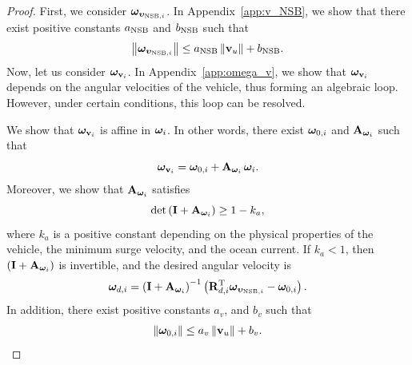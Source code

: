 \begin{proof}
    
    
    First, we consider $\bm{\omega}_{\bm{\upsilon}_{{\rm NSB}, i}}$.
    In Appendix~\ref{app:v_NSB}, we show that there exist positive constants $a_{\rm NSB}$ and $b_{\rm NSB}$ such that 
    \begin{equation}
        \left\|\bm{\omega}_{\bm{\upsilon}_{{\rm NSB}, i}}\right\| \leq a_{\rm NSB}\left\|\mathbf{v}_u\right\| + b_{\rm NSB}.
        \label{eq:NSB_R_omega_NSB_bound}
    \end{equation}
    Now, let us consider $\bm{\omega}_{\mathbf{v}_i}$.
    In Appendix~\ref{app:omega_v}, we show that $\bm{\omega}_{\mathbf{v}_i}$ depends on the angular velocities of the vehicle, thus forming an algebraic loop.
    However, under certain conditions, this loop can be resolved.

    

    We show that $\bm{\omega}_{\mathbf{v}_{i}}$ is affine in $\bm{\omega}_i$.
    In other words, there exist $\bm{\omega}_{0, i}$ and $\mathbf{A}_{\bm{\omega}_i}$ such that \vspace*{-0.35em}
    \begin{equation}
        \bs{\omega}_{\mat{v}_{i}} = \bs{\omega}_{0, i} + \mat{A}_{\bs{\omega}_i}\,\bs{\omega}_i.
        \vspace*{-0.15em}
    \end{equation}
    Moreover, we show that $\mathbf{A}_{\bm{\omega}_i}$ satisfies 
    \begin{equation}
        \det\left(\mat{I} + \mat{A}_{\bs{\omega}_i}\right) \geq 1 - k_a,
        \label{eq:NSB_R_det_A_bound}
        \vspace*{-0.25em}
    \end{equation}
    where $k_a$ is a positive constant depending on the physical properties of the vehicle, the minimum surge velocity, and the ocean current.
    If $k_a < 1$, then $\left(\mathbf{I} + \mathbf{A}_{\bm{\omega}_i}\right)$ is invertible, and the desired angular velocity is 
    \begin{equation}
        \bm{\omega}_{d, i} = \left(\mathbf{I} + \mathbf{A}_{\bm{\omega}_i}\right)^{-1}\left(\mathbf{R}_{d, i}^{\mathrm{T}} \bm{\omega}_{\bm{\upsilon}_{{\rm NSB}, i}} - \bm{\omega}_{0, i}\right).
    \end{equation}
    In addition, there exist positive constants $a_v$, and $b_v$ such that 
    \begin{equation}
        \left\|\bm{\omega}_{0, i}\right\| \leq a_v\left\|\mathbf{v}_u\right\| + b_v.
        \label{eq:NSB_R_omega_0_bound}
    \end{equation}


\end{proof}
